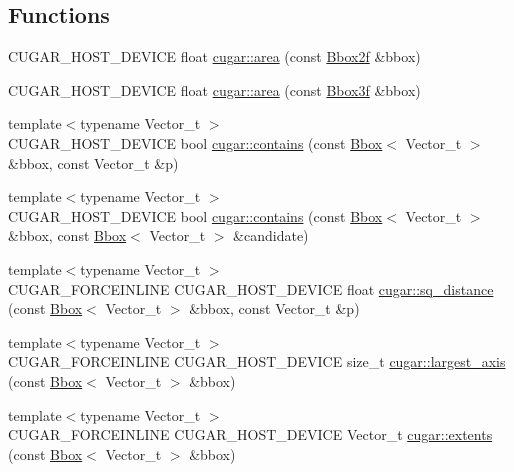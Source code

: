 \subsection*{Functions}
\begin{DoxyCompactItemize}
\item 
C\+U\+G\+A\+R\+\_\+\+H\+O\+S\+T\+\_\+\+D\+E\+V\+I\+CE float \hyperlink{group___bbox_module_ga9bac92087484f436dd7eb6f20cb0b15a}{cugar\+::area} (const \hyperlink{structcugar_1_1_bbox}{Bbox2f} \&bbox)
\item 
C\+U\+G\+A\+R\+\_\+\+H\+O\+S\+T\+\_\+\+D\+E\+V\+I\+CE float \hyperlink{group___bbox_module_gae06f9ebe0da53f175c2d35b0ef604b1a}{cugar\+::area} (const \hyperlink{structcugar_1_1_bbox}{Bbox3f} \&bbox)
\item 
{\footnotesize template$<$typename Vector\+\_\+t $>$ }\\C\+U\+G\+A\+R\+\_\+\+H\+O\+S\+T\+\_\+\+D\+E\+V\+I\+CE bool \hyperlink{group___bbox_module_ga997d14f97dd4c3c80e1896796170ea60}{cugar\+::contains} (const \hyperlink{structcugar_1_1_bbox}{Bbox}$<$ Vector\+\_\+t $>$ \&bbox, const Vector\+\_\+t \&p)
\item 
{\footnotesize template$<$typename Vector\+\_\+t $>$ }\\C\+U\+G\+A\+R\+\_\+\+H\+O\+S\+T\+\_\+\+D\+E\+V\+I\+CE bool \hyperlink{group___bbox_module_gaeb563052dce95e32012796563ea7f611}{cugar\+::contains} (const \hyperlink{structcugar_1_1_bbox}{Bbox}$<$ Vector\+\_\+t $>$ \&bbox, const \hyperlink{structcugar_1_1_bbox}{Bbox}$<$ Vector\+\_\+t $>$ \&candidate)
\item 
{\footnotesize template$<$typename Vector\+\_\+t $>$ }\\C\+U\+G\+A\+R\+\_\+\+F\+O\+R\+C\+E\+I\+N\+L\+I\+NE C\+U\+G\+A\+R\+\_\+\+H\+O\+S\+T\+\_\+\+D\+E\+V\+I\+CE float \hyperlink{group___bbox_module_ga771255b0f67e5f421e1cbb5b2fa367e0}{cugar\+::sq\+\_\+distance} (const \hyperlink{structcugar_1_1_bbox}{Bbox}$<$ Vector\+\_\+t $>$ \&bbox, const Vector\+\_\+t \&p)
\item 
{\footnotesize template$<$typename Vector\+\_\+t $>$ }\\C\+U\+G\+A\+R\+\_\+\+F\+O\+R\+C\+E\+I\+N\+L\+I\+NE C\+U\+G\+A\+R\+\_\+\+H\+O\+S\+T\+\_\+\+D\+E\+V\+I\+CE size\+\_\+t \hyperlink{group___bbox_module_ga45c74efdebfc6b9233fecb19aa268e45}{cugar\+::largest\+\_\+axis} (const \hyperlink{structcugar_1_1_bbox}{Bbox}$<$ Vector\+\_\+t $>$ \&bbox)
\item 
{\footnotesize template$<$typename Vector\+\_\+t $>$ }\\C\+U\+G\+A\+R\+\_\+\+F\+O\+R\+C\+E\+I\+N\+L\+I\+NE C\+U\+G\+A\+R\+\_\+\+H\+O\+S\+T\+\_\+\+D\+E\+V\+I\+CE Vector\+\_\+t \hyperlink{group___bbox_module_ga4f5184c6a804324810a86f4e6ccd29f4}{cugar\+::extents} (const \hyperlink{structcugar_1_1_bbox}{Bbox}$<$ Vector\+\_\+t $>$ \&bbox)
\end{DoxyCompactItemize}


